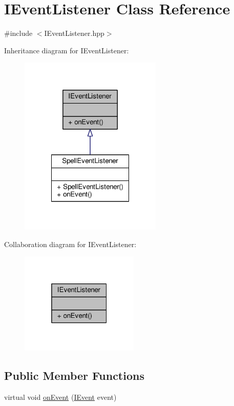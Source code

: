 \hypertarget{class_i_event_listener}{\section{I\-Event\-Listener Class Reference}
\label{class_i_event_listener}
}


{\ttfamily \#include $<$I\-Event\-Listener.\-hpp$>$}



Inheritance diagram for I\-Event\-Listener\-:
\nopagebreak
\begin{figure}[H]
\begin{center}
\leavevmode
\includegraphics[width=192pt]{class_i_event_listener__inherit__graph}
\end{center}
\end{figure}


Collaboration diagram for I\-Event\-Listener\-:
\nopagebreak
\begin{figure}[H]
\begin{center}
\leavevmode
\includegraphics[width=160pt]{class_i_event_listener__coll__graph}
\end{center}
\end{figure}
\subsection*{Public Member Functions}
\begin{DoxyCompactItemize}
\item 
virtual void \hyperlink{class_i_event_listener_ad5716bb760dfcc444e0b38f705579d59}{on\-Event} (\hyperlink{class_i_event}{I\-Event} event)
\end{DoxyCompactItemize}


